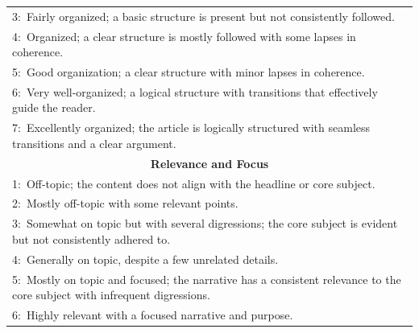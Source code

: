 \documentclass[11pt]{article}
\begin{document}
\begin{table}
{\begin{tabular}{l}
3:~Fairly organized; a basic structure is present but not consistently followed.                                                                                                             \\
4:~Organized; a clear structure is mostly followed with some lapses in coherence.                                                                                                            \\
5:~Good organization; a clear structure with minor lapses in coherence.                                                                                                                      \\
6:~Very well-organized; a logical structure with transitions that effectively guide the reader.                                                                                              \\
7:~Excellently organized; the article is logically structured with seamless transitions and a clear argument.                                                                                \\ 
\midrule
\multicolumn{1}{c}{\textbf{Relevance and Focus}}                                                                                                                                             \\ 
\midrule
1:~Off-topic; the content does not align with the headline or core subject.                                                                                                                  \\
2:~Mostly off-topic with some relevant points.                                                                                                                                               \\
3:~Somewhat on topic but with several digressions; the core subject is evident but not consistently adhered to.                                                                              \\
4:~Generally on topic, despite a few unrelated details.                                                                                                                                      \\
5:~Mostly on topic and focused; the narrative has a consistent relevance to the core subject with infrequent digressions.                                                                    \\
6:~Highly relevant with a focused narrative and purpose.                                                                                                                                     \\

\end{tabular}}
\end{table}
\end{document}
